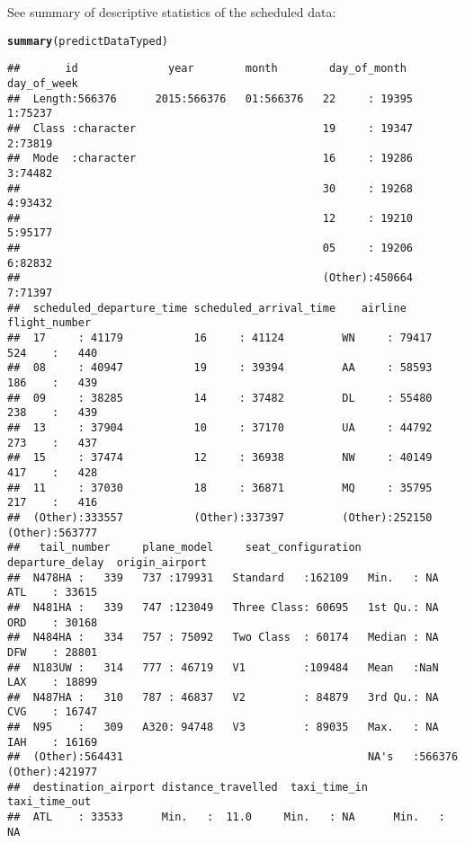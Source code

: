 \documentclass{article}\usepackage[]{graphicx}\usepackage[]{color}
\makeatletter
\newcommand{\hlstd}[1]{\textcolor[rgb]{0.345,0.345,0.345}{#1}}%
\newcommand{\hlkwd}[1]{\textcolor[rgb]{0.737,0.353,0.396}{\textbf{#1}}}%
\newenvironment{kframe}{%
 \def\at@end@of@kframe{}%
 \ifinner\ifhmode%
  \def\at@end@of@kframe{\end{minipage}}%
  \begin{minipage}{\columnwidth}%
 \fi\fi%
 \def\FrameCommand##1{\hskip\@totalleftmargin \hskip-\fboxsep
 \colorbox{shadecolor}{##1}\hskip-\fboxsep
     \hskip-\linewidth \hskip-\@totalleftmargin \hskip\columnwidth}%
 \MakeFramed {\advance\hsize-\width
   \@totalleftmargin\z@ \linewidth\hsize
   \@setminipage}}%
 {\par\unskip\endMakeFramed%
 \at@end@of@kframe}
\newenvironment{knitrout}{}{} %
\makeatother
\begin{document}
See summary of descriptive statistics of the scheduled data: 
\begin{knitrout}
\color{fgcolor}\begin{kframe}
\begin{alltt}
\hlkwd{summary}\hlstd{(predictDataTyped)}
\end{alltt}
\begin{verbatim}
##       id              year        month        day_of_month    day_of_week
##  Length:566376      2015:566376   01:566376   22     : 19395   1:75237    
##  Class :character                             19     : 19347   2:73819    
##  Mode  :character                             16     : 19286   3:74482    
##                                               30     : 19268   4:93432    
##                                               12     : 19210   5:95177    
##                                               05     : 19206   6:82832    
##                                               (Other):450664   7:71397    
##  scheduled_departure_time scheduled_arrival_time    airline       flight_number   
##  17     : 41179           16     : 41124         WN     : 79417   524    :   440  
##  08     : 40947           19     : 39394         AA     : 58593   186    :   439  
##  09     : 38285           14     : 37482         DL     : 55480   238    :   439  
##  13     : 37904           10     : 37170         UA     : 44792   273    :   437  
##  15     : 37474           12     : 36938         NW     : 40149   417    :   428  
##  11     : 37030           18     : 36871         MQ     : 35795   217    :   416  
##  (Other):333557           (Other):337397         (Other):252150   (Other):563777  
##   tail_number     plane_model     seat_configuration departure_delay  origin_airport  
##  N478HA :   339   737 :179931   Standard   :162109   Min.   : NA      ATL    : 33615  
##  N481HA :   339   747 :123049   Three Class: 60695   1st Qu.: NA      ORD    : 30168  
##  N484HA :   334   757 : 75092   Two Class  : 60174   Median : NA      DFW    : 28801  
##  N183UW :   314   777 : 46719   V1         :109484   Mean   :NaN      LAX    : 18899  
##  N487HA :   310   787 : 46837   V2         : 84879   3rd Qu.: NA      CVG    : 16747  
##  N95    :   309   A320: 94748   V3         : 89035   Max.   : NA      IAH    : 16169  
##  (Other):564431                                      NA's   :566376   (Other):421977  
##  destination_airport distance_travelled  taxi_time_in    taxi_time_out   
##  ATL    : 33533      Min.   :  11.0     Min.   : NA      Min.   : NA     

\end{verbatim}
\end{kframe}
\end{knitrout}
\end{document}
